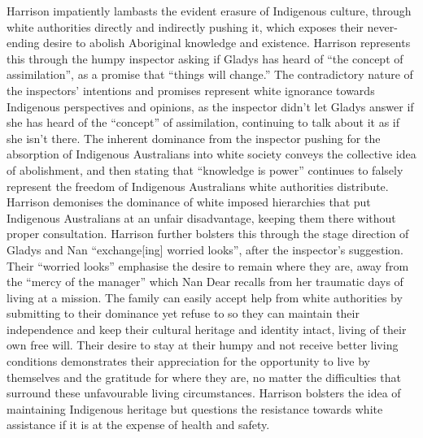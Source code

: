 \documentclass[a4paper]{article}
\begin{document}
Harrison impatiently lambasts the evident erasure of Indigenous culture, through white
authorities directly and indirectly pushing it, which exposes their never-ending desire to
abolish Aboriginal knowledge and existence. Harrison represents this through the humpy
inspector asking if Gladys has heard of “the concept of assimilation”, as a promise that
“things will change.” The contradictory nature of the inspectors’ intentions and promises
represent white ignorance towards Indigenous perspectives and opinions, as the inspector
didn’t let Gladys answer if she has heard of the “concept” of assimilation, continuing to talk
about it as if she isn’t there. The inherent dominance from the inspector pushing for the
absorption of Indigenous Australians into white society conveys the collective idea of
abolishment, and then stating that “knowledge is power” continues to falsely represent the
freedom of Indigenous Australians white authorities distribute. Harrison demonises the
dominance of white imposed hierarchies that put Indigenous Australians at an unfair disadvantage, keeping them there without proper consultation. Harrison further bolsters this
through the stage direction of Gladys and Nan “exchange[ing] worried looks”, after the
inspector’s suggestion. Their “worried looks” emphasise the desire to remain where they are,
away from the “mercy of the manager” which Nan Dear recalls from her traumatic days of
living at a mission. The family can easily accept help from white authorities by submitting to
their dominance yet refuse to so they can maintain their independence and keep their
cultural heritage and identity intact, living of their own free will. Their desire to stay at their
humpy and not receive better living conditions demonstrates their appreciation for the
opportunity to live by themselves and the gratitude for where they are, no matter the
difficulties that surround these unfavourable living circumstances. Harrison bolsters the idea
of maintaining Indigenous heritage but questions the resistance towards white assistance if it
is at the expense of health and safety.\\
\end{document}
